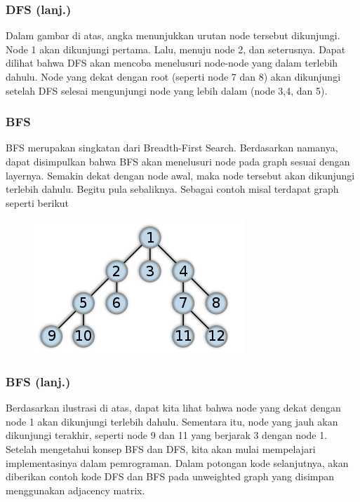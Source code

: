 \begin{frame}
\frametitle{DFS (lanj.)}
Dalam gambar di atas, angka menunjukkan urutan node tersebut dikunjungi. Node 1 akan dikunjungi pertama. Lalu, menuju node 2, dan seterusnya. Dapat dilihat bahwa DFS akan mencoba menelusuri node-node yang dalam terlebih dahulu.
\newline\newline
Node yang dekat dengan root (seperti node 7 dan 8) akan dikunjungi setelah DFS selesai mengunjungi node yang lebih dalam (node 3,4, dan 5).
\end{frame}

\begin{frame}
\frametitle{BFS}

\alert{BFS} merupakan singkatan dari Breadth-First Search. Berdasarkan namanya, dapat disimpulkan bahwa BFS akan menelusuri node pada graph sesuai dengan layernya. Semakin dekat dengan node awal, maka node tersebut akan dikunjungi terlebih dahulu. Begitu pula sebaliknya. Sebagai contoh misal terdapat graph seperti berikut

\begin{figure}
  \centering
  \includegraphics[width=6 cm]{asset/bfs.png}
\end{figure}

\end{frame}

\begin{frame}
\frametitle{BFS (lanj.)}

Berdasarkan ilustrasi di atas, dapat kita lihat bahwa node yang dekat dengan node 1 akan dikunjungi terlebih dahulu. Sementara itu, node yang jauh akan dikunjungi terakhir, seperti node 9 dan 11 yang berjarak 3 dengan node 1.
\newline\newline
Setelah mengetahui konsep BFS dan DFS, kita akan mulai mempelajari implementasinya dalam pemrograman. Dalam potongan kode selanjutnya, akan diberikan contoh kode DFS dan BFS pada unweighted graph yang disimpan menggunakan adjacency matrix.
\end{frame}

